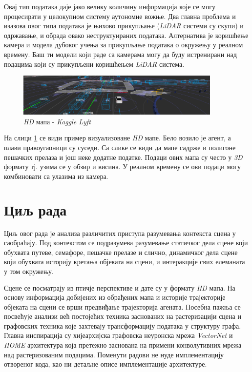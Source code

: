 \documentclass[11pt,oneside]{memoir}
\begin{document}
Овај тип података даје јако велику количину информација које се могу процесирати у целокупном систему аутономне вожње. Два главна проблема
и изазова овог типа података је њихово прикупљање (\textit{LiDAR} системи су скупи) и одржавање, и обрада овако неструктуираних података. Алтернатива
је коришћење камера и модела дубоког учења за прикупљање података о окружењу у реалном времену. Баш ти модели који раде са
камерама могу да буду истренирани над подацима који су прикупљени коришћењем \textit{LiDAR} система.

\begin{figure}[H]
  \centering
  \includegraphics[width=0.9\textwidth]{images/lyft-hd-map.png}
  \caption{\textit{HD} мапа - \textit{Kaggle Lyft} \cite{kaggle_lyft} \label{kaggle-lyft-example}}
\end{figure}

На слици \ref{kaggle-lyft-example} се види пример визуализоване \textit{HD} мапе. Бело возило је агент, а плави правоугаоници су суседи. 
Са слике се види да мапе садрже и полигоне пешачких прелаза и још неке додатне податке. Подаци ових мапа су често у \textit{3D} формату
тј. узима се у обзир и висина. У реалном времену се ови подаци могу комбиновати са улазима из камера. 

\section{Циљ рада}

Циљ овог рада је анализа различитих приступа разумевања контекста сцена у саобраћају. 
Под контекстом се подразумева разумевање статичког дела сцене који обухвата путеве,
семафоре, пешачке прелазе и слично, динамичког дела сцене који обухвата историју кретања објеката на сцени, и интеракције 
свих елеманата у том окружењу. 

Сцене се посматрају из птичје перспективе
и дате су у формату \textit{HD} мапа. На основу информација добијених из обрађених мапа и историје трајекторије објеката
на сцени се врши предвиђање трајекторија агената. Посебна пажња се посвећује анализи већ постојећих
техника заснованих на растеризацији сцена и графовских техника које захтевају трансформацију података у структуру графа. 
Главна инспирација су хијеархијска графовска неуронска мрежа \textit{VectorNet} \cite{vectornet} и \textit{HOME} \cite{home}
архитектура која претежно заснована на примени конволутивних мрежа над растеризованим подацима. Поменути радови не нуде
имплементацију отвореног кода, као ни детаљне описе имплементације архитектуре.
\end{document}
